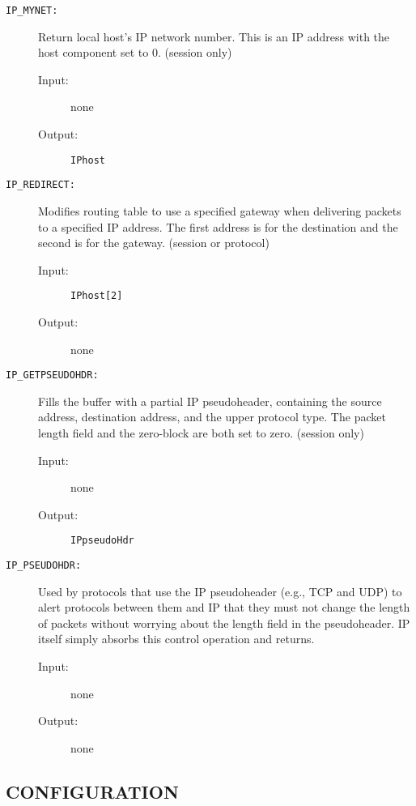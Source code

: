 \begin{description}

\item[{\tt IP\_MYNET:}]
Return local host's IP network number.
This is an IP address with the host
component set to 0.  (session only)
\begin{description}
\item[{\rm Input:}] none
\item[{\rm Output:}] {\tt IPhost}
\end{description}

\item[{\tt IP\_REDIRECT:}] Modifies routing table to use a specified
gateway when delivering packets to a specified IP address.
The first address is for the destination
and the second is for the gateway.  (session or protocol)
\begin{description}
\item[{\rm Input:}] {\tt IPhost[2]}
\item[{\rm Output:}] none
\end{description}

\item[{\tt IP\_GETPSEUDOHDR:}] 
Fills the buffer with a partial IP pseudoheader, containing the
source address, destination address, and the upper protocol type.
The packet length field and the zero-block are both set to zero. 
(session only)
\begin{description}
\item[{\rm Input:}] none
\item[{\rm Output:}] {\tt IPpseudoHdr} 
\end{description}

\item[{\tt IP\_PSEUDOHDR:}] 
Used by protocols that use the IP pseudoheader (e.g., TCP and UDP) to
alert protocols between them and IP that they must not change the
length of packets without worrying about the length field in the
pseudoheader.  IP itself simply absorbs this control operation and
returns.
\begin{description}
\item[{\rm Input:}] none
\item[{\rm Output:}] none
\end{description}



\end{description}

\subsection*{CONFIGURATION}

